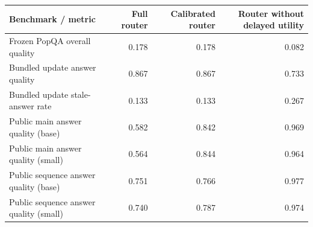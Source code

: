 \begin{tabular}{lrrr}
\toprule
Benchmark / metric & Full router & Calibrated router & Router without delayed utility \\
\midrule
Frozen PopQA overall quality & 0.178 & 0.178 & 0.082 \\
Bundled update answer quality & 0.867 & 0.867 & 0.733 \\
Bundled update stale-answer rate & 0.133 & 0.133 & 0.267 \\
Public main answer quality (base) & 0.582 & 0.842 & 0.969 \\
Public main answer quality (small) & 0.564 & 0.844 & 0.964 \\
Public sequence answer quality (base) & 0.751 & 0.766 & 0.977 \\
Public sequence answer quality (small) & 0.740 & 0.787 & 0.974 \\
\bottomrule
\end{tabular}
